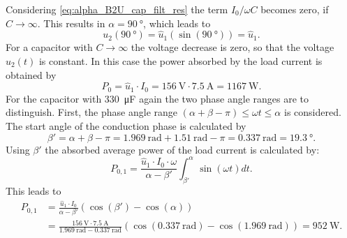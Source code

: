\begin{solutionblock}
    Considering \eqref{eq:alpha_B2U_cap_filt_res} the term $I_\mathrm{0}/{\omega C}$ becomes zero, if $C\rightarrow \infty$. 
    This results in $\alpha=\SI{90}{\degree}$, which leads to
    \begin{equation} 
        u_\mathrm{2}(\SI{90}{\degree})=\hat{u}_\mathrm{1}(\sin(\SI{90}{\degree}))=\hat{u}_\mathrm{1}.
    \end{equation}
    For a capacitor with $C\rightarrow \infty$ the voltage decrease is zero, so that the voltage $u_\mathrm{2}(t)$ is constant.
    In this case the power absorbed by the load current is obtained by
    \begin{equation} 
        P_\mathrm{0}=\hat{u}_\mathrm{1} \cdot I_{\mathrm{0}}=\SI{156}{\volt}\cdot\SI{7.5}{\ampere}=\SI{1167}{\watt}.
    \end{equation}
    For the capacitor with \SI{330}{\micro\farad} again the two phase angle ranges are to distinguish. First, the phase angle range
    $(\alpha+\beta-\pi)\leq\omega t\leq\alpha$ is considered. The start angle of the conduction phase is calculated by
    \begin{equation} 
        \beta'=\alpha+\beta-\pi=\SI{1.969}{\radian}+\SI{1.51}{\radian}-\pi
        =\SI{0.337}{\radian} = \SI{19.3}{\degree}.
    \end{equation}
    Using $\beta'$ the absorbed average power of the load current is calculated by:
    \begin{equation} 
        P_\mathrm{0,1}=\frac{\hat{u}_\mathrm{1} \cdot I_{\mathrm{0}} \cdot \omega}{\alpha-\beta'} \int_{\beta'}^{\alpha} \sin(\omega t) dt.
    \end{equation}
    This leads to
    \begin{equation} 
        \begin{aligned}
            P_\mathrm{0,1}&=\frac{\hat{u}_\mathrm{1} \cdot I_{\mathrm{0}}}{\alpha-\beta'} \left( \cos(\beta') - \cos(\alpha) \right) \\
            &=\frac{\SI{156}{\volt} \cdot \SI{7.5}{\ampere}}{\SI{1.969}{\radian}-\SI{0.337}{\radian}}
             \left( \cos(\SI{0.337}{\radian}) - \cos(\SI{1.969}{\radian}) \right)=\SI{952}{\watt}.
        \end{aligned}
    \end{equation}

\end{solutionblock}
